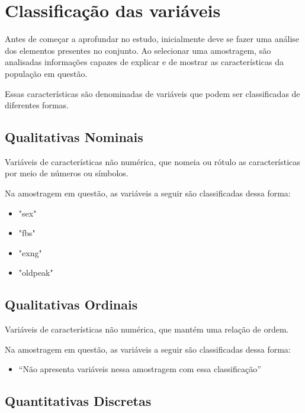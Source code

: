 \chapter{Classificação das variáveis}

    \setcounter{section}{0}

    Antes de começar a aprofundar no estudo, inicialmente deve se fazer uma análise dos elementos 
    presentes no conjunto. Ao selecionar uma amostragem, são analisadas informações capazes de explicar 
    e de mostrar as características da população em questão.

    Essas características são denominadas de variáveis que podem ser classificadas de diferentes formas.

    \section{Qualitativas Nominais}

    Variáveis de características não numérica, que nomeia ou rótulo as características por meio de números ou símbolos. 
    
    Na amostragem em questão, as variáveis a seguir são classificadas dessa forma: 

    \begin{itemize}
        \item "sex"
        \item "fbs"
        \item "exng"
        \item "oldpeak"
    \end{itemize}

    \section{Qualitativas Ordinais}

    Variáveis de características não numérica, que mantém uma relação de ordem. 
  
    Na amostragem em questão, as variáveis a seguir são classificadas dessa forma: 

    \begin{itemize}
        \item “Não apresenta variáveis nessa amostragem com essa classificação”
    \end{itemize}

    \section{Quantitativas Discretas}

